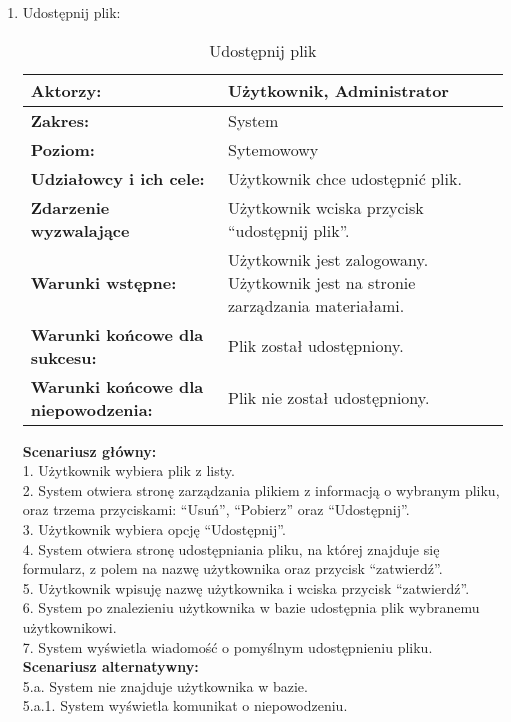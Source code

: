 \begin{enumerate}[label=(\Roman*)]
\item Udostępnij plik:
	\begin{table}[h]
\centering
\caption{Udostępnij plik}
\label{Udostepnijplik}
\begin{tabular}{|p{7cm}|p{7cm}|}
  \hline 
  \textbf{Aktorzy:} & Użytkownik, Administrator\\
  \hline
  \textbf{Zakres:} & System \\
	\hline
  \textbf{Poziom:} & Sytemowowy \\
	\hline
  \textbf{Udziałowcy i ich cele: } & Użytkownik chce udostępnić plik. \\
	\hline
  \textbf{Zdarzenie wyzwalające } & Użytkownik wciska przycisk “udostępnij plik”. \\
	\hline
  \textbf{Warunki wstępne: } & Użytkownik jest zalogowany. Użytkownik jest na stronie zarządzania materiałami.
 \\
	\hline
  \textbf{Warunki końcowe dla sukcesu:} & Plik został udostępniony.
 \\
	\hline
  \textbf{Warunki końcowe dla niepowodzenia:} & Plik nie został udostępniony. \\
  \hline
\end{tabular} 
\end{table}

\textbf{Scenariusz główny:}\\
1. Użytkownik wybiera plik z listy.\\
2. System otwiera stronę zarządzania plikiem z informacją o wybranym pliku, oraz trzema przyciskami: “Usuń”, “Pobierz” oraz “Udostępnij”.\\
3. Użytkownik wybiera opcję “Udostępnij”.\\
4. System otwiera stronę udostępniania pliku, na której znajduje się formularz, z polem na nazwę użytkownika oraz przycisk “zatwierdź”.\\
5. Użytkownik wpisuję nazwę użytkownika i wciska przycisk “zatwierdź”.\\
6. System po znalezieniu użytkownika w bazie udostępnia plik wybranemu użytkownikowi.\\
7. System wyświetla wiadomość o pomyślnym udostępnieniu pliku.\\
\textbf{Scenariusz alternatywny:}\\
5.a. System nie znajduje użytkownika w bazie.\\
5.a.1. System wyświetla komunikat o niepowodzeniu.\\


\end{enumerate}
